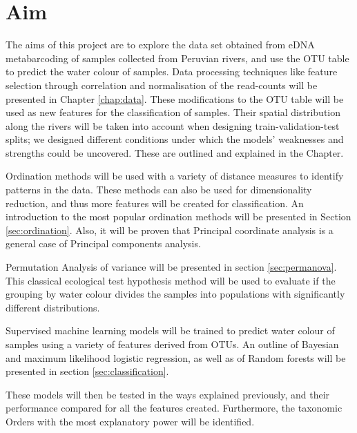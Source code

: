 
\section{Aim}

The aims of this project are to explore the data set obtained from eDNA metabarcoding of samples collected from Peruvian rivers, and use the OTU table to predict the water colour of samples. Data processing techniques like feature selection through correlation and normalisation of the read-counts will be presented in Chapter \ref{chap:data}. These modifications to the OTU table will be used as new features for the classification of samples. Their spatial distribution along the rivers will be taken into account when designing train-validation-test splits; we designed different conditions under which the models'  weaknesses and strengths could be uncovered. These are outlined and explained in the Chapter.

Ordination methods will be used with a variety of distance measures to identify patterns in the data. These methods can also be used for dimensionality reduction, and thus more features will be created for classification. An introduction to the most popular ordination methods will be presented in Section \ref{sec:ordination}. Also, it will be proven that Principal coordinate analysis is a general case of Principal components analysis.

 Permutation Analysis of variance  will be presented in section \ref{sec:permanova}. This classical ecological test hypothesis method  will be used to evaluate if the grouping by water colour divides the samples into populations with significantly different distributions. 

Supervised machine learning models will be trained to predict water colour of samples using a variety of features derived from OTUs. An outline of Bayesian and maximum likelihood logistic regression, as well as of Random forests will be presented in section \ref{sec:classification}. 

These models will then be tested in the ways explained previously, and their performance compared for all the features created. Furthermore, the taxonomic Orders with the most explanatory power will be identified.



